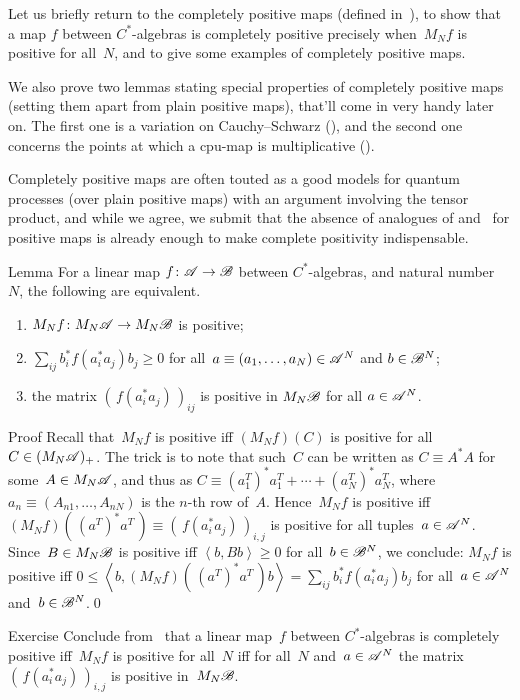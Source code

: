 \documentclass[a]{subfiles}
\begin{document}
\begin{parsec}%
\begin{point}%
Let us briefly return
to the completely positive maps (defined in~),
to show that a map $f$ between $C^*$-algebras
is completely positive precisely
when~$M_Nf$ is positive for all~$N$,
and to give some examples of completely positive maps.

We also prove two lemmas
stating special properties of completely positive maps (setting
them apart from plain positive maps),
that'll come in very handy later on.
The first one is a variation on Cauchy--Schwarz
(),
and the second one concerns
the points at which a cpu-map is multiplicative ().

Completely positive maps are often touted as 
a good models for quantum processes
(over plain positive maps)
with an argument involving the tensor product,
and while we agree,
we submit that the absence of analogues of  and~
for positive maps
is already enough to make complete positivity indispensable.
\end{point}
\begin{point}[n-pos]{Lemma}%
For a linear map $f\colon \mathscr{A}\to\mathscr{B}$
between $C^*$-algebras,
and natural number~$N$,
the following are equivalent.
\begin{enumerate}
\item
\label{n-pos-1}
$M_Nf\colon M_N\mathscr{A}\to M_N\mathscr{B}$
is positive;
\item
\label{n-pos-2}
	$\sum_{ij} b^*_if(a^*_ia_j)b_j \geq 0$
	for all~$a\equiv(a_1,\dotsc,a_N)\in \mathscr{A}^N$
	and $b\in \mathscr{B}^N$;
\item
\label{n-pos-3}
the matrix $(\,f(a_i^*a_j)\,)_{ij}$
is positive in $M_N\mathscr{B}$ for all $a\in\mathscr{A}^N$.
\end{enumerate}
\begin{point}{Proof}%
Recall that~$M_Nf$ is positive
iff $(M_Nf)(C)$ is positive for all $C\in (M_N\mathscr{A})_{+}$.
The trick is to note that such~$C$ can be written as $C\equiv A^*A$
for some~$A\in M_N\mathscr{A}$,
and thus as $C \equiv (a_1^T)^* a_1^T+\dotsb+(a_N^T)^*a_N^T$,
where $a_n\equiv(A_{n1},\dotsc,A_{nN})$ is the $n$-th row of~$A$.
Hence~$M_Nf$ is positive
iff $(M_Nf)(\,(a^T)^*a^T\, )\equiv(\,f(a_i^*a_j)\,)_{i,j}$ is positive
for all tuples~$a\in\mathscr{A}^N$.
Since~$B\in M_N\mathscr{B}$ is positive iff $\left<b,Bb\right>\geq 0$
for all~$b\in \mathscr{B}^N$,
we conclude:
$M_Nf$ is positive iff 
$0\leq\left<b,(M_Nf)(\, (a^T)^*a^T\,) b\right>
= \sum_{ij} b_i^*f(a_i^*a_j)b_j$
for all~$a\in\mathscr{A}^N$ and~$b\in\mathscr{B}^N$.\qed
\end{point}
\end{point}
\begin{point}[cp]{Exercise}%
Conclude from~
that a linear map~$f$ between $C^*$-algebras
is completely positive iff~$M_Nf$ is positive for all~$N$
iff 
for all~$N$ and~$a\in \mathscr{A}^N$
the matrix $(\,f(a_i^*a_j)\,)_{i,j}$ 
is positive in~$M_N\mathscr{B}$.


\end{point}
\end{parsec}
\end{document}
